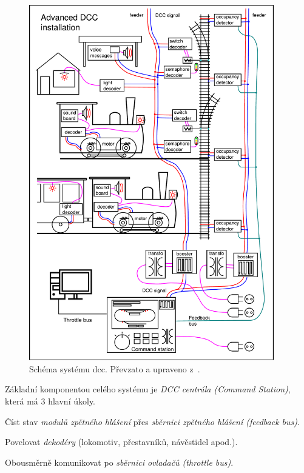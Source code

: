 \begin{figure}[ht!]
\includegraphics[width=0.95\textwidth]{data/schema_dcc_en.pdf}
\caption{Schéma systému \gls{dcc}. Převzato a upraveno z~\cite{dcc_wikipedia:web}.}
\label{fig:dcc-overview}
\end{figure}

Základní komponentou celého systému je \textit{DCC centrála (Command Station)},
která má 3 hlavní úkoly.

\begin{compactenum}
\item Číst stav \textit{modulů zpětného hlášení} přes \textit{sběrnici zpětného hlášení (feedback bus)}.
\item Povelovat \textit{dekodéry} (lokomotiv, přestavníků, návěstidel apod.).
\item Obousměrně komunikovat po \textit{sběrnici ovladačů (throttle bus)}.
\end{compactenum}

